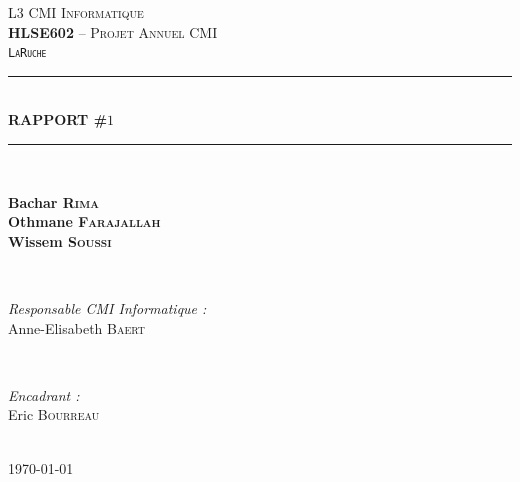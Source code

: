 \documentclass[a4paper,12pt]{report}
\newcommand{\HRule}{\rule{\linewidth}{0.5mm}}
\theoremstyle{break}
\theoremstyle{break}
\theoremstyle{break}
\theoremstyle{break}
\theoremstyle{definition}
\theoremstyle{remark}
\begin{document}
\begin{titlepage}
\textsc{\LARGE L3 CMI Informatique}\\[0.5cm]
\textsc{\Large \textbf{HLSE602} -- Projet Annuel CMI}\\[0.25cm]
\textsc{\Large \texttt{LaRuche}}\\[2cm]
\HRule \\[0.4cm]
{\huge \bfseries RAPPORT \#$1$}\\[0.1cm]
\HRule \\[2cm]
\begin{minipage}{0.5\textwidth}
\centering \large
\textbf{Bachar \textsc{Rima}}\\
\textbf{Othmane \textsc{Farajallah}}\\
\textbf{Wissem \textsc{Soussi}}
\end{minipage} \\[2cm]
\begin{minipage}[b]{0.5\textwidth}
\begin{flushleft} \large
\emph{Responsable CMI Informatique :} \\
Anne-Elisabeth \textsc{Baert} \\
\end{flushleft}
\end{minipage}
~
\begin{minipage}[b]{0.4\textwidth}
\begin{flushright} \large
\emph{Encadrant :}\\
Eric \textsc{Bourreau}
\end{flushright}
\end{minipage}\\[1.5cm]
{\large \today}\\[1cm]
\hspace{\fill}
\vfill %
\end{titlepage}
{
  \hypersetup{linkcolor=black}
  \tableofcontents
  \setcounter{page}{3}
}
\end{document}
